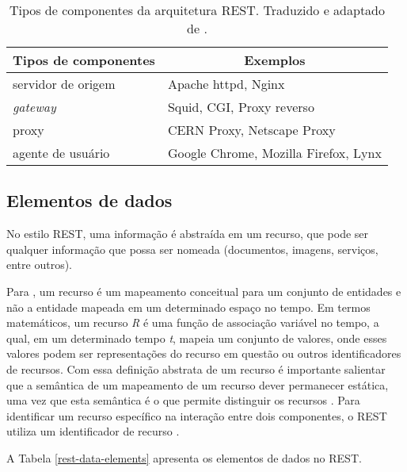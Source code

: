     \begin{table}[ht!]
    \centering
    \caption{Tipos de componentes da arquitetura REST. Traduzido e adaptado de \cite{fielding2002}.}
    \label{rest-components-elements}
    \begin{tabular}{l|l}
    \hline
    \multicolumn{1}{c|}{\textbf{Tipos de componentes}} & \multicolumn{1}{c}{\textbf{Exemplos}} \\ \hline
    servidor de origem                                  & Apache httpd, Nginx                    \\ \hline
    \textit{gateway}                                    & Squid, CGI, Proxy reverso              \\ \hline
    proxy                                               & CERN Proxy, Netscape Proxy             \\ \hline
    agente de usuário                                   & Google Chrome, Mozilla Firefox, Lynx   \\ \hline
    \end{tabular}
    \end{table}
  
  \subsection{Elementos de dados}
    
    No estilo REST, uma informação é abstraída em um recurso, que pode ser qualquer informação que possa ser nomeada
    (documentos, imagens, serviços, entre outros).
    
    Para , um recurso é um mapeamento conceitual para um conjunto de entidades e não a entidade mapeada
    em um determinado espaço no tempo. Em termos matemáticos, um recurso \textit{R} é uma função de associação variável no tempo, a qual, em um 
    determinado tempo \textit{t}, mapeia um conjunto de valores, onde esses valores podem ser representações do recurso em questão ou
    outros identificadores de recursos.
    Com essa definição abstrata de um recurso é importante salientar que a semântica de um mapeamento de um recurso dever permanecer
    estática, uma vez que esta semântica é o que permite distinguir os recursos \cite{fielding2002}.
    Para identificar um recurso específico na interação entre dois componentes, o REST utiliza um identificador de recurso \cite{fielding2002}.
    
    A Tabela \ref{rest-data-elements} apresenta os elementos de dados no REST.
    
